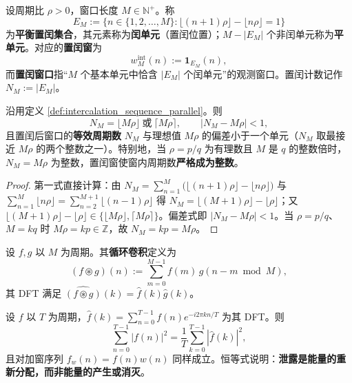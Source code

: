 \begin{definition}[置闰序列与置闰窗]\label{def:intercalation_sequence_parallel}
设周期比 $\rho>0$，窗口长度 $M\in\mathbb{N}^+$。称
\[
E_M:=\big\{n\in\{1,2,\dots,M\}:\lfloor(n+1)\rho\rfloor-\lfloor n\rho\rfloor=1\big\}
\]
为\textbf{平衡置闰集合}，其元素称为\textbf{闰单元}（置闰位置）；$M-|E_M|$ 个非闰单元称为\textbf{平单元}。对应的\textbf{置闰窗}为
\[
w^{\mathrm{int}}_M(n):=\mathbf{1}_{E_M}(n),
\]
而\textbf{置闰窗口}指“$M$ 个基本单元中恰含 $|E_M|$ 个闰单元”的观测窗口。置闰计数记作 $N_M:=|E_M|$。
\end{definition}

\begin{proposition}[置闰窗的整数性]\label{prop:intercalation_window_integrality_parallel}
沿用定义 \ref{def:intercalation_sequence_parallel}。则
\[
N_M=\lfloor M\rho\rfloor\ \text{或}\ \lceil M\rho\rceil,
\qquad
\big|N_M-M\rho\big|<1,
\]
且置闰后窗口的\textbf{等效周期数} $N_M$ 与理想值 $M\rho$ 的偏差小于一个单元（$N_M$ 取最接近 $M\rho$ 的两个整数之一）。特别地，当 $\rho=p/q$ 为有理数且 $M$ 是 $q$ 的整数倍时，$N_M=M\rho$ 为整数，置闰窗使窗内周期数\textbf{严格成为整数}。
\end{proposition}

\begin{proof}
第一式直接计算：由 $N_M=\sum_{n=1}^{M}\big(\lfloor(n+1)\rho\rfloor-\lfloor n\rho\rfloor\big)$ 与 $\sum_{n=1}^{M}\lfloor n\rho\rfloor=\sum_{n=2}^{M+1}\lfloor(n-1)\rho\rfloor$ 得 $N_M=\lfloor(M+1)\rho\rfloor-\lfloor\rho\rfloor$；又 $\lfloor(M+1)\rho\rfloor-\lfloor\rho\rfloor\in\{\lfloor M\rho\rfloor,\lceil M\rho\rceil\}$。偏差式即 $|N_M-M\rho|<1$。当 $\rho=p/q$、$M=kq$ 时 $M\rho=kp\in\mathbb Z$，故 $N_M=kp=M\rho$。
\end{proof}

\begin{definition}[循环卷积]\label{def:circular_convolution_parallel}
设 $f,g$ 以 $M$ 为周期。其\textbf{循环卷积}定义为
\[
(f\circledast g)(n):=\sum_{m=0}^{M-1}f(m)\,g(n-m\bmod M),
\]
其 DFT 满足 $\widehat{(f\circledast g)}(k)=\hat f(k)\hat g(k)$。
\end{definition}

\begin{theorem}[离散帕塞瓦尔恒等式]\label{thm:discrete_parseval_parallel}
设 $f$ 以 $T$ 为周期，$\hat f(k)=\sum_{n=0}^{T-1}f(n)e^{-i2\pi kn/T}$ 为其 DFT。则
\[
\sum_{n=0}^{T-1}|f(n)|^{2}=\frac{1}{T}\sum_{k=0}^{T-1}|\hat f(k)|^{2},
\]
且对加窗序列 $f_w(n)=f(n)w(n)$ 同样成立。恒等式说明：\textbf{泄露是能量的重新分配，而非能量的产生或消灭}。
\end{theorem}

